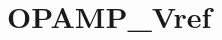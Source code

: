 \hypertarget{group___o_p_a_m_p___vref}{\section{O\-P\-A\-M\-P\-\_\-\-Vref}
\label{group___o_p_a_m_p___vref}
}
